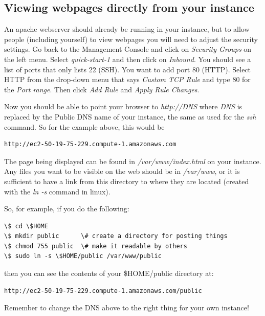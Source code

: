 \documentclass[letterpaper,10pt,english]{sphinxmanual}
\begin{document}
\subsection{Viewing webpages directly from your instance}
\label{aws:viewing-webpages-directly-from-your-instance}
An apache webserver should already be running in your instance,
but to allow people (including yourself) to view
webpages you will need to adjust the security settings.  Go back to the
Management Console and click on \emph{Security Groups} on the left menu.  Select
\emph{quick-start-1} and then click on \emph{Inbound}.  You should see a list of ports
that only lists 22 (SSH).  You want to add port 80 (HTTP).  Select HTTP from
the drop-down menu that says \emph{Custom TCP Rule} and type 80 for the \emph{Port
range}.  Then click \emph{Add Rule} and \emph{Apply Rule Changes}.

Now you should be able to point your browser to \emph{http://DNS} where \emph{DNS} is
replaced by the Public DNS name of your instance, the same as used for the
\emph{ssh} command.  So for the example above, this would be

\begin{Verbatim}[commandchars=\\\{\}]
http://ec2-50-19-75-229.compute-1.amazonaws.com
\end{Verbatim}

The page being displayed can be found in \emph{/var/www/index.html} on your
instance.  Any files you want to be visible on the web should be in
\emph{/var/www}, or it is sufficient to have a link from this directory to where
they are located (created with the \emph{ln -s} command in linux).

So, for example, if you do the following:

\begin{Verbatim}[commandchars=\\\{\}]
\$ cd \$HOME
\$ mkdir public      \# create a directory for posting things
\$ chmod 755 public  \# make it readable by others
\$ sudo ln -s \$HOME/public /var/www/public
\end{Verbatim}

then you can see the contents of your \$HOME/public directory at:

\begin{Verbatim}[commandchars=\\\{\}]
http://ec2-50-19-75-229.compute-1.amazonaws.com/public
\end{Verbatim}

Remember to change the DNS above to the right thing for your own instance!
\end{document}
